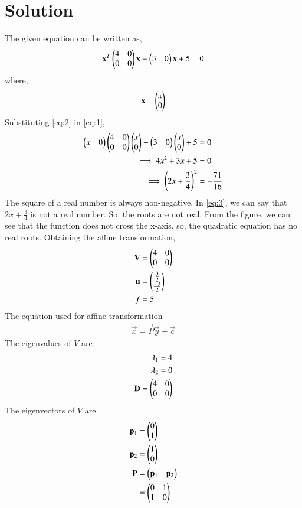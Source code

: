 \documentclass[journal,12pt,twocolumn]{IEEEtran}
\begin{document}
\section*{Solution}
The given equation can be written as,
\begin{align}
    \mathbf{x}^T\begin{pmatrix}4 & 0 \\ 0 & 0\end{pmatrix}\mathbf{x} + \begin{pmatrix}3 & 0\end{pmatrix}\mathbf{x} + 5 = 0 \label{eq:1}
\end{align}
where,
\begin{align}
    \mathbf{x} = \begin{pmatrix}x \\ 0\end{pmatrix} \label{eq:2}
\end{align}
Substituting \eqref{eq:2} in \eqref{eq:1},
\begin{align}
    \begin{pmatrix}x & 0\end{pmatrix}\begin{pmatrix}4 & 0 \\ 0 & 0\end{pmatrix}\begin{pmatrix}x \\ 0\end{pmatrix} + \begin{pmatrix}3 & 0\end{pmatrix}\begin{pmatrix}x \\ 0\end{pmatrix} + 5 &= 0 \\
    \implies 4x^2 + 3x + 5 &= 0\\
    \implies \left(2x + \frac{3}{4}\right)^2 &= -\frac{71}{16}\label{eq:3}
\end{align}
The square of a real number is always non-negative. In \eqref{eq:3}, we can say that $2x + \frac{3}{4}$ is not a real number. So, the roots are not real. From the figure, we can see that the function does not cross the x-axis, so, the quadratic equation has no real roots. Obtaining the affine transformation,
\begin{align}
    \mathbf{V} &= \begin{pmatrix}4 & 0 \\ 0 & 0\end{pmatrix}\\
    \mathbf{u} &= \begin{pmatrix}\frac{3}{2}\\\frac{-3}{2}\end{pmatrix}\\
    f &= 5
\end{align}
The equation used for affine transformation
\begin{align}
    \vec{x} = \vec{P}\vec{y} + \vec{c}
\end{align}
The eigenvalues of $V$ are
\begin{align}
    \lambda_1 = 4\\
    \lambda_2 = 0\\
    \mathbf{D} = \begin{pmatrix}4 & 0\\0 & 0\end{pmatrix}
\end{align}
The eigenvectors of $V$ are
\begin{align}
    \mathbf{p}_1 &= \begin{pmatrix}0 \\ 1\end{pmatrix}\\
    \mathbf{p}_2 &= \begin{pmatrix}1 \\ 0\end{pmatrix}\\
    \mathbf{P} &= \begin{pmatrix}\mathbf{p}_1 & \mathbf{p}_2\end{pmatrix}\\
    &= \begin{pmatrix}0 & 1 \\ 1 & 0\end{pmatrix}
\end{align}
\end{document}
